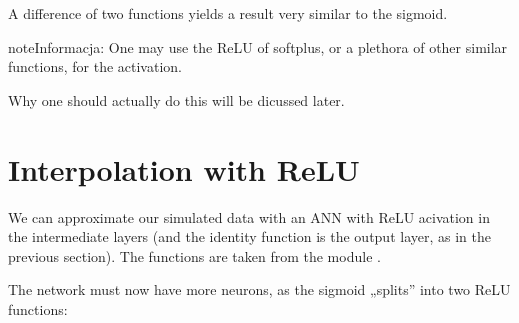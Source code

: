 \documentclass[a4paper,12pt,polish]{jupyterBook}
\begin{document}
\sphinxAtStartPar
A difference of two  functions yields a result very similar to the sigmoid.
\begin{sphinxVerbatimOutput}

\noindent{}
\end{sphinxVerbatimOutput}

\begin{sphinxadmonition}{note}{Informacja:}
\sphinxAtStartPar
One may use the ReLU of softplus, or a plethora of other similar functions, for the activation.
\end{sphinxadmonition}

\sphinxAtStartPar
Why one should actually do this will be dicussed later.


\section{Interpolation with ReLU}
\label{\detokenize{docs/rectification:interpolation-with-relu}}
\sphinxAtStartPar
We can approximate our simulated data with an ANN with ReLU acivation in the intermediate layers (and the identity function is the output layer, as in the previous section). The functions are taken from the module .
\begin{sphinxVerbatimInput}

\begin{sphinxVerbatim}[commandchars=\\\{\}]
    
\end{sphinxVerbatim}
\end{sphinxVerbatimInput}

\sphinxAtStartPar
The network must now have more neurons, as the sigmoid „splits” into two ReLU functions:
\begin{sphinxVerbatimInput}

\begin{sphinxVerbatim}[commandchars=\\\{\}]
\PYG{p}{[}\PYG{p}{]}                   
  
\end{sphinxVerbatim}
\end{sphinxVerbatimInput}
\end{document}
